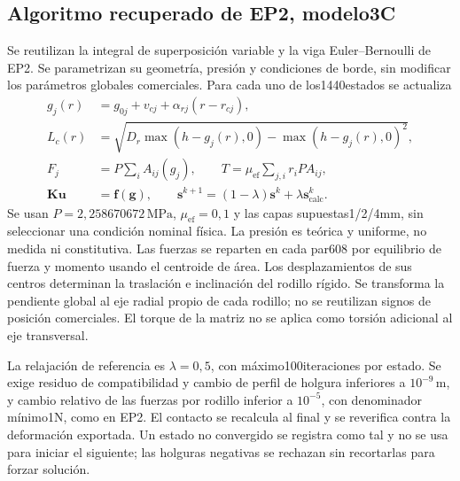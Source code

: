 \subsection{Algoritmo recuperado de EP2, modelo3C}
Se reutilizan la integral de superposición variable y la viga Euler--Bernoulli de EP2\parencite{equipo_entrega2_2026}.
Se parametrizan su geometría, presión y condiciones de borde, sin modificar los parámetros globales comerciales.
Para cada uno de los1440estados se actualiza
\begin{align}
g_j(r)&=g_{0j}+v_{cj}+\alpha_{rj}(r-r_{cj}),\\
L_c(r)&=\sqrt{D_r\max(h-g_j(r),0)-\max(h-g_j(r),0)^2},\\
F_j&=P\sum_i A_{ij}(g_j),\qquad T=\mu_{\mathrm{ef}}\sum_{j,i}r_iP A_{ij},\\
\mathbf K\mathbf u&=\mathbf f(\mathbf g),\qquad
\mathbf s^{k+1}=(1-\lambda)\mathbf s^k+\lambda\mathbf s_{\mathrm{calc}}^k.
\end{align}
Se usan $P=2,258670672\,\mathrm{MPa}$, $\mu_{\mathrm{ef}}=0,1$ y las capas supuestas1/2/4mm,
sin seleccionar una condición nominal física. La presión es teórica y uniforme, no medida ni constitutiva.
Las fuerzas se reparten en cada par608 por equilibrio de fuerza y momento usando el centroide de área.
Los desplazamientos de sus centros determinan la traslación e inclinación del rodillo rígido.
Se transforma la pendiente global al eje radial propio de cada rodillo; no se reutilizan signos de posición comerciales.
El torque de la matriz no se aplica como torsión adicional al eje transversal.

La relajación de referencia es $\lambda=0,5$, con máximo100iteraciones por estado.
Se exige residuo de compatibilidad y cambio de perfil de holgura inferiores a $10^{-9}\,\mathrm{m}$,
y cambio relativo de las fuerzas por rodillo inferior a $10^{-5}$, con denominador mínimo1N,
como en EP2. El contacto se recalcula al final y se reverifica contra la deformación exportada.
Un estado no convergido se registra como tal y no se usa para iniciar el siguiente;
las holguras negativas se rechazan sin recortarlas para forzar solución.

